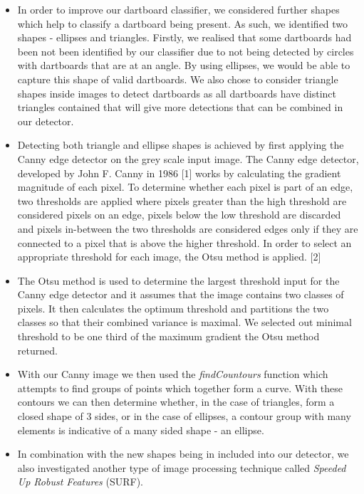 \documentclass[a4paper]{article}
\begin{document}
\begin{itemize}
\item In order to improve our dartboard classifier, we considered further
  shapes which help to classify a dartboard being present.  As such, we
    identified two shapes - ellipses and triangles. Firstly, we realised that
    some dartboards had been not been identified by our classifier due to not
    being detected by circles with dartboards that are at an angle. By using
    ellipses, we would be able to capture this shape of valid dartboards. We
    also chose to consider triangle shapes inside images to detect dartboards
    as all dartboards have distinct triangles contained that will give more
    detections that can be combined in our detector.

\item Detecting both triangle and ellipse shapes is achieved by first applying
  the Canny edge detector on the grey scale input image. The Canny edge
    detector, developed by  John F. Canny in 1986 [1] works by calculating the
    gradient magnitude of each pixel. To determine whether each pixel is part
    of an edge, two thresholds are applied where pixels greater than the high
    threshold are considered pixels on an edge, pixels below the low threshold
    are discarded and pixels in-between the two thresholds are considered edges
    only if they are connected to a pixel that is above the higher threshold.
    In order to select an appropriate threshold for each image, the Otsu method
    is applied.  [2]

\item The Otsu method is used to determine the largest threshold input for the
  Canny edge detector and it assumes that the image contains two classes of
    pixels. It then calculates the optimum threshold and partitions the two
    classes so that their combined variance is maximal. We selected out minimal
    threshold to be one third of the maximum gradient the Otsu method
    returned.

\item With our Canny image we then used the \textit{findCountours} function
  which attempts to find groups of points which together form a curve. With
    these contours we can then determine whether, in the case of triangles,
    form a closed shape of 3 sides, or in the case of ellipses, a contour group
    with many elements is indicative of a many sided shape - an ellipse.

\item In combination with the new shapes being in included into our detector,
  we also investigated another type of image processing technique called
    \textit{Speeded Up Robust Features} (SURF).


\end{itemize}
\end{document}
